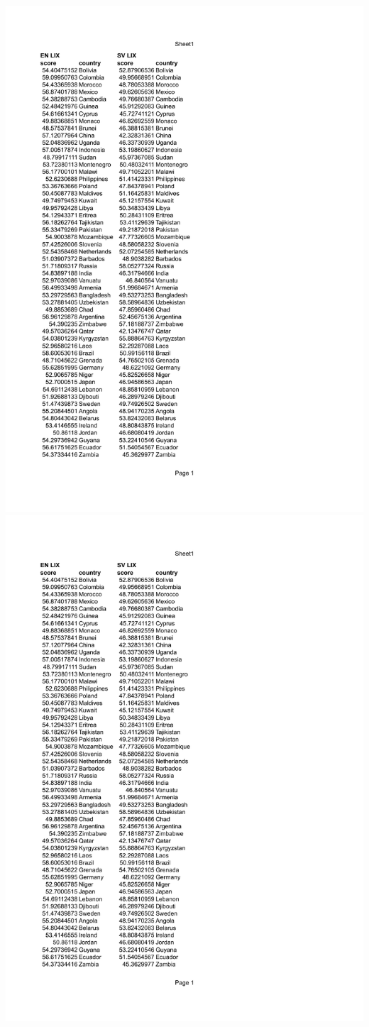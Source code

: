 \documentclass[a4paper]{article}
\begin{document}
\includegraphics[page=2,scale=0.75]{./DATA/LIX.pdf}
\includegraphics[page=3,scale=0.75]{./DATA/LIX.pdf}
\end{document}
